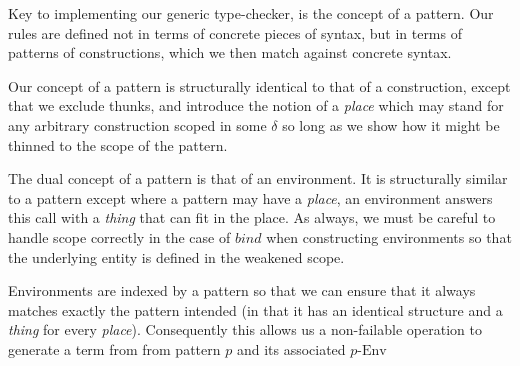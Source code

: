 
Key to implementing our generic type-checker, is the concept of a pattern. Our
rules are defined not in terms of concrete pieces of syntax, but in terms of
patterns of constructions, which we then match against concrete syntax.

Our concept of a pattern is structurally identical to that of a construction,
except that we exclude thunks, and introduce the notion of a \emph{place} which
may stand for any arbitrary construction scoped in some $δ$ so long as we show
how it might be thinned to the scope of the pattern.

The dual concept of a pattern is that of an environment. It is structurally
similar to a pattern except where a pattern may have a \emph{place}, an
environment answers this call with a \emph{thing} that can fit in the place.
As always, we must be careful to handle scope correctly in the case of $bind$
when constructing environments so that the underlying entity is defined in
the weakened scope.

Environments are indexed by a pattern so that we can ensure that it always
matches exactly the pattern intended (in that it has an identical structure
and a \emph{thing} for every \emph{place}). Consequently this allows us a
non-failable operation to generate a term from from pattern $p$ and its
associated $p\mbox{-Env}$

